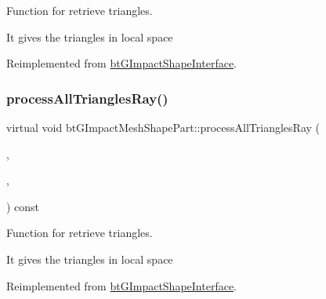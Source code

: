 Function for retrieve triangles. 

It gives the triangles in local space 

Reimplemented from \hyperlink{classbtGImpactShapeInterface_ae1dc14b29f49fc0262be72dbe9d7b75b}{bt\+G\+Impact\+Shape\+Interface}.

\mbox{\label{classbtGImpactMeshShapePart_a5a7308f0d61d403394d909b45506a7e9}} 
\subsubsection{\texorpdfstring{process\+All\+Triangles\+Ray()}{processAllTrianglesRay()}\hspace{0.1cm}{\footnotesize\ttfamily [1/2]}}
{\footnotesize\ttfamily virtual void bt\+G\+Impact\+Mesh\+Shape\+Part\+::process\+All\+Triangles\+Ray (\begin{DoxyParamCaption}\item[{\hyperlink{classbtTriangleCallback}{bt\+Triangle\+Callback} $\ast$}]{,  }\item[{const bt\+Vector3 \&}]{,  }\item[{const bt\+Vector3 \&}]{ }\end{DoxyParamCaption}) const\hspace{0.3cm}{\ttfamily [virtual]}}



Function for retrieve triangles. 

It gives the triangles in local space 

Reimplemented from \hyperlink{classbtGImpactShapeInterface_af67273183582c6696169ee4ae5d6cf37}{bt\+G\+Impact\+Shape\+Interface}.

\mbox{\label{classbtGImpactMeshShapePart_a63c6db1d4458384ef776784a79eaf8f8}} 
